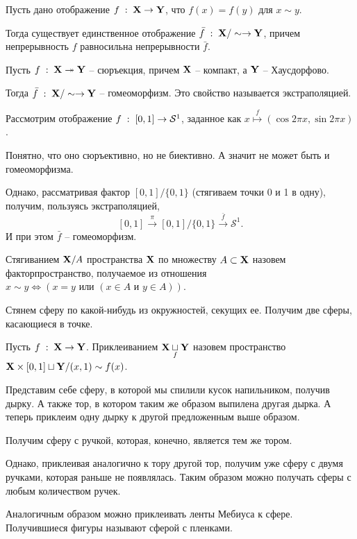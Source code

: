 \begin{Lem}
Пусть дано отображение $f\; : \; \mathbf{X} \to \mathbf{Y}$, что  $f(x) = f(y)$ для  $x\sim y$.    

Тогда существует единственное отображение $\bar{f}\; : \; \mathbf{X} / \sim \to \mathbf{Y}$, причем непрерывность $f$ равносильна непрерывности $\bar{f}$.
\end{Lem}

\begin{Def}
    [Экстраполяция]
    Пусть $f\; : \; \mathbf{X} \twoheadrightarrow \mathbf{Y}$ -- сюръекция, причем  $\mathbf{X}$ -- компакт, а  $\mathbf{Y}$ -- Хаусдорфово.

    Тогда $\bar{f}\; : \; \mathbf{X} / \sim \to \mathbf{Y}$ -- гомеоморфизм. Это свойство называется экстраполяцией. 
\end{Def}

\begin{Ex}
    Рассмотрим отображение $f\; : \; [0,1] \to \mathcal{S}^1$, заданное как $x \overset{f}{\mapsto} (\cos 2\pi x, \sin 2\pi x)$.
    
    Понятно, что оно сюръективно, но не биективно. А значит не может быть и гомеоморфизма.

    Однако, рассматривая фактор $[0,1] / \{0,1\}$ (стягиваем точки 0 и 1 в одну), получим, пользуясь экстраполяцией,
     \[
         [0,1] \overset{\pi}{\to} [0,1] / \{0,1\} \overset{\bar{f}}{\to} \mathcal{S}^1.
    \] 
    И при этом $\bar{f}$ -- гомеоморфизм.
\end{Ex}

\begin{Def}
    [Стягивание]
    Стягиванием $\mathbf{X} / A$ пространства  $\mathbf{X}$ по множеству $A \subset \mathbf{X}$ назовем факторпространство, получаемое из отношения $x\sim y \Leftrightarrow (x=y \text{ или } (x\in A \text{ и } y \in A))$. 
\end{Def}
\begin{Ex}
    Стянем сферу по какой-нибудь из окружностей, секущих ее. Получим две сферы, касающиеся в точке.
\end{Ex}

\begin{Def}
    [Приклеивание]
    Пусть $f\; : \; \mathbf{X} \to  \mathbf{Y}$. Приклеиванием $\mathbf{X} \underset{f}{\sqcup} \mathbf{Y}$ назовем пространство $\mathbf{X} \times [0,1] \sqcup \mathbf{Y} / (x,1) \sim f(x)$.
\end{Def}
\begin{Ex}
    Представим себе сферу, в которой мы спилили кусок напильником, получив дырку. А также тор, в котором таким же образом выпилена другая дырка. А теперь приклеим одну дырку к другой предложенным выше образом. 

    Получим сферу с ручкой, которая, конечно, является тем же тором.

    Однако, приклеивая аналогично к тору другой тор, получим уже сферу с двумя ручками, которая раньше не появлялась. Таким образом можно получать сферы с любым количеством ручек.
\end{Ex}
\begin{Ex}
    Аналогичным образом можно приклеивать ленты Мебиуса к сфере. Получившиеся фигуры называют сферой с пленками.
\end{Ex}


